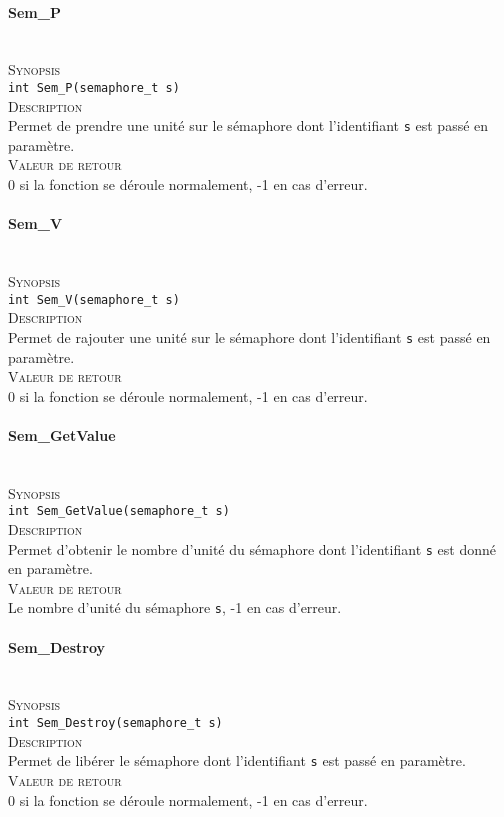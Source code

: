 \documentclass{report}
\newcommand{\myparagraph}[1]{\paragraph*{#1}\mbox{}\\}
\begin{document}
\myparagraph{Sem\_P}
\textsc{Synopsis}\\	
	\texttt{int Sem\_P(semaphore\_t s)}\\

\textsc{Description}\\
	Permet de prendre une unité sur le sémaphore dont l'identifiant \texttt{s} est passé en paramètre.\\
	
\textsc{Valeur de retour}\\
0 si la fonction se déroule normalement, -1 en cas d'erreur.\\

\myparagraph{Sem\_V}
\textsc{Synopsis}\\	

\texttt{int Sem\_V(semaphore\_t s)}\\

\textsc{Description}\\
	Permet de rajouter une unité sur le sémaphore dont l'identifiant \texttt{s} est passé en paramètre.\\
	
\textsc{Valeur de retour}\\
0 si la fonction se déroule normalement, -1 en cas d'erreur.\\

\myparagraph{Sem\_GetValue}

\textsc{Synopsis}\\	
	\texttt{int Sem\_GetValue(semaphore\_t s)}\\

\textsc{Description}\\
	Permet d'obtenir le nombre d'unité du sémaphore dont l'identifiant \texttt{s} est donné en paramètre.\\
	
\textsc{Valeur de retour}\\
Le nombre d'unité du sémaphore \texttt{s}, -1 en cas d'erreur.\\

\myparagraph{Sem\_Destroy}

\textsc{Synopsis}\\	
	\texttt{int Sem\_Destroy(semaphore\_t s)}\\

\textsc{Description}\\
	Permet de libérer le sémaphore dont l'identifiant \texttt{s} est passé en paramètre.\\

\textsc{Valeur de retour}\\
0 si la fonction se déroule normalement, -1 en cas d'erreur.\\
	
\end{document}
